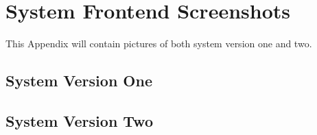\chapter{System Frontend Screenshots}
\label{apdx:screenshots}
This Appendix will contain pictures of both system version one and two.

\section{System Version One}

\section{System Version Two}
